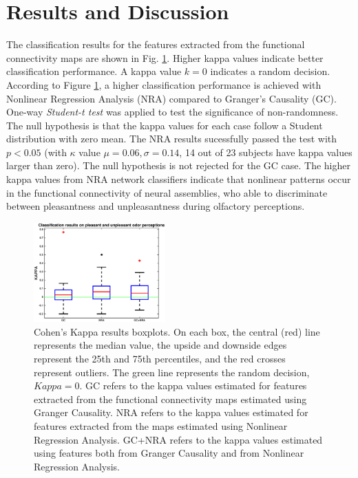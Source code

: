 \section{Results and Discussion}

The classification results for the features extracted from the functional connectivity maps are shown in Fig. \ref{fig:kappa}. Higher kappa values indicate better classification performance. A kappa value $k=0$ indicates a random decision. According to Figure \ref{fig:kappa}, a higher classification performance is achieved with Nonlinear Regression Analysis (NRA) compared to Granger's Causality (GC). One-way \emph{Student-t test} was applied to test the significance of non-randomness. The null hypothesis is that the kappa values for each case follow a Student distribution with zero mean. The NRA results sucessfully passed the test with $p<0.05$ (with $\kappa$ value $\mu = 0.06, \sigma = 0.14$, 14 out of 23 subjects have kappa values larger than zero). The null hypothesis is not rejected for the GC case. The higher kappa values from NRA network classifiers indicate that nonlinear patterns occur in the functional connectivity of neural assemblies, who able to discriminate between pleasantness and unpleasantness during olfactory perceptions. 

\begin{figure}[t]
    \centering
    \includegraphics[width=0.45\textwidth]{./images/kappa.eps}
    \caption{Cohen's Kappa results boxplots. On each box, the central (red) line represents the median value, the upside and downside edges represent the 25th and 75th percentiles, and the red crosses represent outliers. The green line represents the random decision, $Kappa=0$. GC refers to the kappa values estimated for features extracted from the functional connectivity maps estimated using Granger Causality. NRA refers to the kappa values estimated for features extracted from the maps estimated using Nonlinear Regression Analysis. GC+NRA refers to the kappa values estimated using features both from Granger Causality and from Nonlinear Regression Analysis.}
    \label{fig:kappa}
\end{figure}

